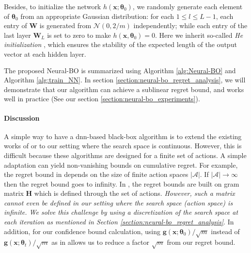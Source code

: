 
Besides, to initialize the network $h(\mathbf{x}; \boldsymbol{\theta}_0)$, we randomly generate each element of $\boldsymbol{\theta}_0$ from an appropriate Gaussian distribution: for each $1 \leq l \leq L-1$, each entry of $\mathbf{W}$ is generated from $\mathcal N(0, 2/m)$ independently; while each entry of the last layer $\mathbf{W}_L$ is set to zero to make $h(\mathbf{x}, \boldsymbol{\theta}_0) = 0$. Here we inherit so-called \emph{He initialization} \citep{he2015delving}, which ensures the stability of the expected length of the output vector at each hidden layer. 

The proposed Neural-BO is summarized using Algorithm \ref{alg:Neural-BO} and Algorithm \ref{alg:train_NN}. In section \ref{section:neural-bo_regret_analysis}, we will demonstrate that our algorithm can achieve a sublinear regret bound, and works well in practice (See our section \ref{section:neural-bo_experiments}).
\paragraph{Discussion}
A simple way to have a \ac{dnn}-based black-box algorithm is to extend the existing works of \citet{zhou2020neural,zhang2021neural} or \citet{kassraie2022neural} to our setting where the search space is continuous. However, this is difficult because these algorithms are designed for a finite set of actions. A simple adaptation can yield non-vanishing bounds on cumulative regret. For example, the regret bound in \citet{kassraie2022neural} depends on the size of finite action spaces $\lvert \mathcal A \rvert$. If $\lvert \mathcal A \rvert \rightarrow \infty$ then the regret bound goes to infinity. In \citet{zhou2020neural,zhang2021neural}, the regret bounds are built on gram matrix $\mathbf{H}$ which is defined through the set of actions. \textit{However, such a matrix cannot even be defined in our setting where the search space (action space) is infinite. We solve this challenge by using a discretization of the search space at each iteration as mentioned in Section \ref{section:neural-bo_regret_analysis}}. In addition, for our confidence bound calculation, using $\mathbf{g}(\mathbf{x};\boldsymbol{\theta}_0)/\sqrt{m}$ instead of $\mathbf{g}(\mathbf{x};\boldsymbol{\theta}_t)/\sqrt{m}$ as in \citet{zhou2020neural,zhang2021neural} allows us to reduce a factor $\sqrt{m}$ from our regret bound.    

